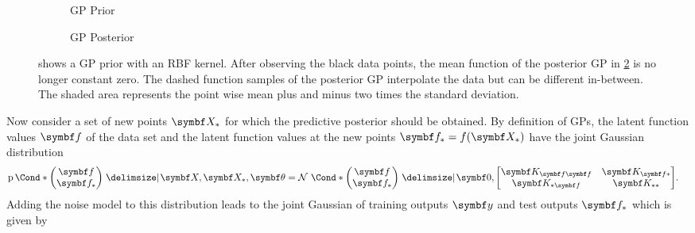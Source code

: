 \begin{figure}[t]
    \begin{subfigure}[b]{\halffigurewidth}
        \centering
        \caption{GP Prior}
        \label{fig:gp:gp_posterior:prior}
    \end{subfigure}
    \hfill
    \begin{subfigure}[b]{\halffigurewidth}
        \centering
        \caption{GP Posterior}
        \label{fig:gp:gp_posterior:posterior}
    \end{subfigure}
    \caption[GP posterior]{
         shows a GP prior with an RBF kernel.
        After observing the black data points, the mean function of the posterior GP in \cref{fig:gp:gp_posterior:posterior} is no longer constant zero.
        The dashed function samples of the posterior GP interpolate the data but can be different in-between.
        The shaded area represents the point wise mean plus and minus two times the standard deviation.
        \label{fig:gp:gp_posterior}
    }
\end{figure}
Now consider a set of new points $\mat{X}_\ast$ for which the predictive posterior should be obtained.
By definition of GPs, the latent function values $\mat{f}$ of the data set and the latent function values at the new points $\mat{f}_\ast = f(\mat{X}_\ast)$ have the joint Gaussian distribution
\begin{align}
    \Prob*{\begin{pmatrix}
            \mat{f} \\
            \mat{f}_\ast
        \end{pmatrix} \given \mat{X}, \mat{X}_\ast, \mat{\theta}} & = \Gaussian*{\begin{pmatrix}
            \mat{f} \\
            \mat{f}_\ast
        \end{pmatrix} \given \mat{0}, \begin{bmatrix}
            \mat{K}_{\mat{f}\mat{f}} & \mat{K}_{\mat{f}\ast} \\
            \mat{K}_{\ast\mat{f}}    & \mat{K}_{\ast\ast}
        \end{bmatrix}}.
\end{align}
Adding the noise model to this distribution leads to the joint Gaussian of training outputs $\mat{y}$ and test outputs $\mat{f}_\ast$ which is given by
